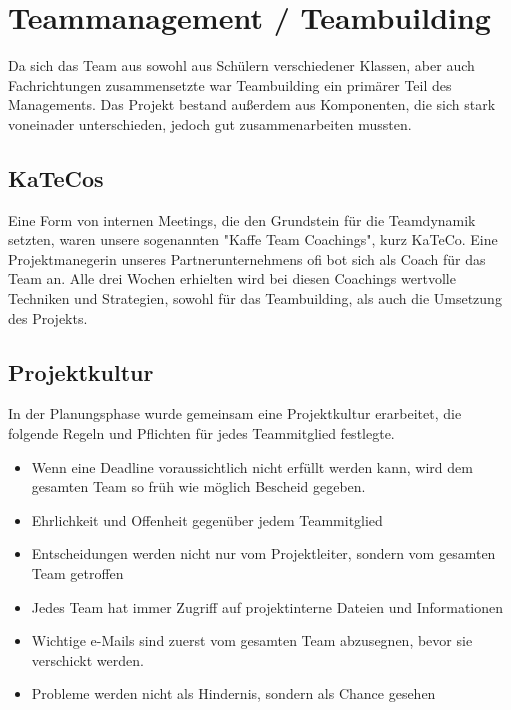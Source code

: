 \section{Teammanagement / Teambuilding}
Da sich das Team aus sowohl aus Schülern verschiedener Klassen, aber auch Fachrichtungen
zusammensetzte war Teambuilding ein primärer Teil des Managements. Das Projekt bestand außerdem
aus Komponenten, die sich stark voneinader unterschieden, jedoch gut zusammenarbeiten mussten.

  \subsection{KaTeCos}
  Eine Form von internen Meetings, die den Grundstein für die Teamdynamik setzten, waren unsere
  sogenannten "Kaffe Team Coachings", kurz KaTeCo. Eine Projektmanegerin unseres Partnerunternehmens ofi
  bot sich als Coach für das Team an. Alle drei Wochen erhielten wird bei diesen Coachings wertvolle Techniken und
  Strategien, sowohl für das Teambuilding, als auch die Umsetzung des Projekts.

  \subsection{Projektkultur}
  In der Planungsphase wurde gemeinsam eine Projektkultur erarbeitet, die folgende Regeln und Pflichten
  für jedes Teammitglied festlegte.
  \begin{itemize}
    \item Wenn eine Deadline voraussichtlich nicht erfüllt werden kann, wird dem gesamten Team so früh wie möglich Bescheid gegeben.
    \item Ehrlichkeit und Offenheit gegenüber jedem Teammitglied
    \item Entscheidungen werden nicht nur vom Projektleiter, sondern vom gesamten Team getroffen
    \item Jedes Team hat immer Zugriff auf projektinterne Dateien und Informationen
    \item Wichtige e-Mails sind zuerst vom gesamten Team abzusegnen, bevor sie verschickt werden.
    \item Probleme werden nicht als Hindernis, sondern als Chance gesehen
  \end{itemize}
